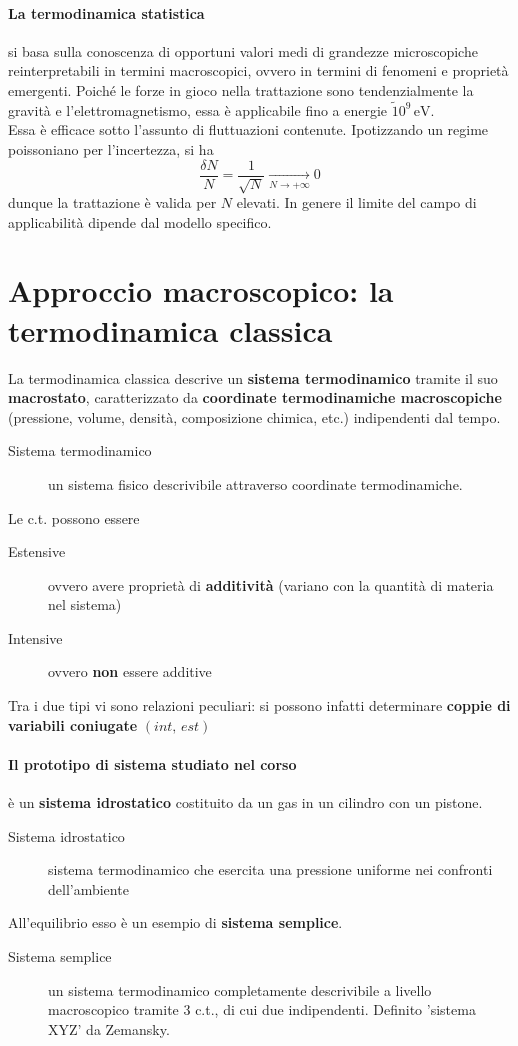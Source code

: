 \documentclass[10pt, oneside]{book}
\begin{document}
\paragraph{La termodinamica statistica} si basa sulla conoscenza di opportuni valori medi di grandezze microscopiche reinterpretabili in termini macroscopici, ovvero in termini di fenomeni e proprietà emergenti. Poiché le forze in gioco nella trattazione sono tendenzialmente la gravità e l'elettromagnetismo, essa è applicabile fino a energie $\tilde 10^{9} \, \mathrm{eV}$. 
\\Essa è efficace sotto l'assunto di fluttuazioni contenute. Ipotizzando un regime poissoniano per l'incertezza, si ha
\[\frac{\delta N}{N} = \frac{1}{\sqrt{N}} \xrightarrow[N \rightarrow +\infty]{} 0\]
dunque la trattazione è valida per $N$ elevati. In genere il limite del campo di applicabilità dipende dal modello specifico.

\section{Approccio macroscopico: la termodinamica classica}
La termodinamica classica descrive un \textbf{sistema termodinamico} tramite il suo \textbf{macrostato}, caratterizzato da \textbf{coordinate termodinamiche macroscopiche} (pressione, volume, densità, composizione chimica, etc.) indipendenti dal tempo.
\begin{description}
\item[Sistema termodinamico] un sistema fisico descrivibile attraverso coordinate termodinamiche.
\end{description}
Le c.t. possono essere
\begin{description}
\item[Estensive] ovvero avere proprietà di \textbf{additività} (variano con la quantità di materia nel sistema)
\item[Intensive] ovvero \textbf{non} essere additive
\end{description}
Tra i due tipi vi sono relazioni peculiari: si possono infatti determinare \textbf{coppie di variabili coniugate} $(int, \, est)$
\paragraph{Il prototipo di sistema studiato nel corso} è un \textbf{sistema idrostatico} costituito da un gas in un cilindro con un pistone.
\begin{description}
\item[Sistema idrostatico] sistema termodinamico che esercita una pressione uniforme nei confronti dell'ambiente
\end{description}
All'equilibrio esso è un esempio di \textbf{sistema semplice}.
\begin{description}
\item[Sistema semplice] un sistema termodinamico completamente descrivibile a livello macroscopico tramite 3 c.t., di cui due indipendenti. Definito 'sistema XYZ' da Zemansky.
\end{description}
\end{document}
